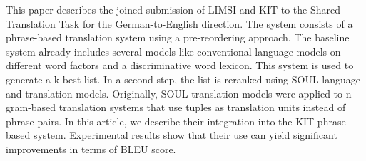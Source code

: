 This paper describes the joined submission of LIMSI and KIT to the Shared Translation Task for the German-to-English direction.  The system consists of a phrase-based translation system using a pre-reordering approach. The baseline system already includes several models like conventional language models on different word factors and a discriminative word lexicon. This system is used to generate a k-best list. In a second step, the list is reranked using SOUL language and translation models. Originally, SOUL translation models were applied to n-gram-based translation systems that use tuples as translation units instead of phrase pairs. In this article, we describe their integration into the KIT phrase-based system. Experimental results show that their use can yield significant improvements in terms of BLEU score.
